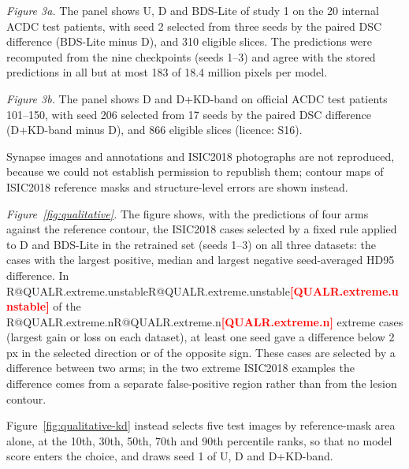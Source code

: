 \documentclass[10pt]{article}
\makeatletter
\newcommand{\R}[1]{\ifcsname R@#1\endcsname\csname R@#1\endcsname\else\textbf{\textcolor{red}{[#1]}}\fi}
\makeatother
\begin{document}
\emph{Figure 3a.} The panel shows U, D and BDS-Lite of study 1 on the 20 internal ACDC test patients, with seed 2 selected from three seeds by the paired DSC difference (BDS-Lite minus D), and 310 eligible slices. The predictions were recomputed from the nine checkpoints (seeds 1--3) and agree with the stored predictions in all but at most 183 of 18.4 million pixels per model.

\emph{Figure 3b.} The panel shows D and D+KD-band on official ACDC test patients 101--150, with seed 206 selected from 17 seeds by the paired DSC difference (D+KD-band minus D), and 866 eligible slices (licence: S16).

Synapse images and annotations and ISIC2018 photographs are not reproduced, because we could not establish permission to republish them; contour maps of ISIC2018 reference masks and structure-level errors are shown instead.

\emph{Figure~\ref{fig:qualitative}.} The figure shows, with the predictions of four arms against the reference contour, the ISIC2018 cases selected by a fixed rule applied to D and BDS-Lite in the retrained set (seeds 1--3) on all three datasets: the cases with the largest positive, median and largest negative seed-averaged HD95 difference. In \R{QUALR.extreme.unstable} of the \R{QUALR.extreme.n} extreme cases (largest gain or loss on each dataset), at least one seed gave a difference below 2\,px in the selected direction or of the opposite sign. These cases are selected by a difference between two arms; in the two extreme ISIC2018 examples the difference comes from a separate false-positive region rather than from the lesion contour.

Figure~\ref{fig:qualitative-kd} instead selects five test images by reference-mask area alone, at the 10th, 30th, 50th, 70th and 90th percentile ranks, so that no model score enters the choice, and draws seed 1 of U, D and D+KD-band.
\end{document}
